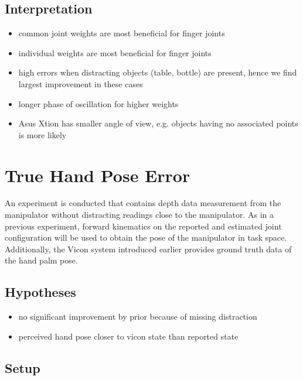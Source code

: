 \subsection{Interpretation}

\begin{itemize}
\item common joint weights are most beneficial for finger joints
\item individual weights are most beneficial for finger joints
\item high errors when distracting objects (table, bottle) are present, hence we find largest improvement in these cases
\item longer phase of oscillation for higher weights
\item Asus Xtion has smaller angle of view, e.g. objects having no associated points is more likely
\end{itemize}




\section{True Hand Pose Error}

An experiment is conducted that contains depth data measurement from the manipulator without distracting readings close to the manipulator. As in a previous experiment, forward kinematics on the reported and estimated joint configuration will be used to obtain the pose of the manipulator in task space. Additionally, the Vicon system introduced earlier provides ground truth data of the hand palm pose.




\subsection{Hypotheses}



\begin{itemize}
\item no significant improvement by prior because of missing distraction
\item perceived hand pose closer to vicon state than reported state
\end{itemize}


\subsection{Setup}



